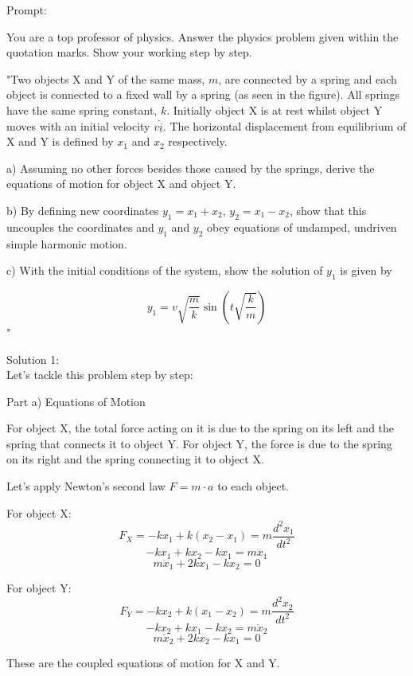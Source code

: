 \documentclass[a4paper,11pt]{article}
\begin{document}
Prompt:
\begin{spverbatim}
    You are a top professor of physics. Answer the physics problem given within the quotation marks. Show your working step by step.

    "Two objects X and Y of the same mass, \( m \), are connected by a spring and each object is connected to a fixed wall by a spring (as seen in the figure). All springs have the same spring constant, \( k \). Initially object X is at rest whilst object Y moves with an initial velocity \( v \hat{\underline{i}} \). The horizontal displacement from equilibrium of X and Y is defined by \( x_{1} \) and \( x_{2} \) respectively. 

    a) Assuming no other forces besides those caused by the springs, derive the equations of motion for object X and object Y. 
    
    b) By defining new coordinates \( y_{1} = x_{1} + x_{2} \), \( y_{2} = x_{1} - x_{2} \), show that this uncouples the coordinates and \( y_{1} \) and \( y_{2} \) obey equations of undamped, undriven simple harmonic motion. 
    
    c) With the initial conditions of the system, show the solution of \( y_{1} \) is given by 
    
    \[
    y_{1} = v \sqrt{\frac{m}{k}} \sin(t \sqrt{\frac{k}{m}})
    \]"
\end{spverbatim}

\bigskip

\noindent Solution 1: \\

Let's tackle this problem step by step:

Part a) Equations of Motion

For object X, the total force acting on it is due to the spring on its left and the spring that connects it to object Y. For object Y, the force is due to the spring on its right and the spring connecting it to object X. 

Let's apply Newton's second law \( F = m \cdot a \) to each object.

For object X:
\[ F_{X} = -kx_{1} + k(x_{2} - x_{1}) = m \frac{d^{2}x_{1}}{dt^{2}} \]
\[ -kx_{1} + kx_{2} - kx_{1} = m \ddot{x}_{1} \]
\[ m \ddot{x}_{1} + 2kx_{1} - kx_{2} = 0 \]

For object Y:
\[ F_{Y} = -kx_{2} + k(x_{1} - x_{2}) = m \frac{d^{2}x_{2}}{dt^{2}} \]
\[ -kx_{2} + kx_{1} - kx_{2} = m \ddot{x}_{2} \]
\[ m \ddot{x}_{2} + 2kx_{2} - kx_{1} = 0 \]

These are the coupled equations of motion for X and Y.
\end{document}
